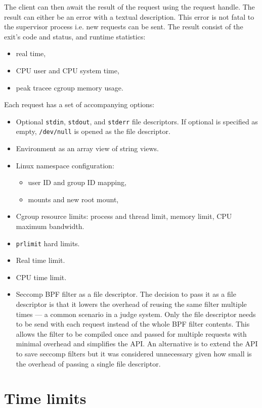\documentclass[en]{pracamgr}
\begin{document}
The client can then await the result of the request using the request handle. The result can either be an error with a textual description. This error is not fatal to the supervisor process i.e. new requests can be sent. The result consist of the exit's code and status, and runtime statistics:
\begin{itemize}
    \item real time,
    \item CPU user and CPU system time,
    \item peak tracee cgroup memory usage.
\end{itemize}
Each request has a set of accompanying options:
\begin{itemize}
    \item Optional \texttt{stdin}, \texttt{stdout}, and \texttt{stderr} file descriptors. If optional is specified as empty, \texttt{/dev/null} is opened as the file descriptor.
    \item Environment as an array view of string views.
    \item Linux namespace configuration:
        \begin{itemize}
            \item user ID and group ID mapping,
            \item mounts and new root mount,
        \end{itemize}
    \item Cgroup resource limits: process and thread limit, memory limit, CPU maximum bandwidth.
    \item \texttt{prlimit} hard limits.
    \item Real time limit.
    \item CPU time limit.
    \item Seccomp BPF filter as a file descriptor. The decision to pass it as a file descriptor is that it lowers the overhead of reusing the same filter multiple times --- a common scenario in a judge system. Only the file descriptor needs to be send with each request instead of the whole BPF filter contents. This allows the filter to be compiled once and passed for multiple requests with minimal overhead and simplifies the API. An alternative is to extend the API to save seccomp filters but it was considered unnecessary given how small is the overhead of passing a single file descriptor.
\end{itemize}

\section{Time limits}
\end{document}
